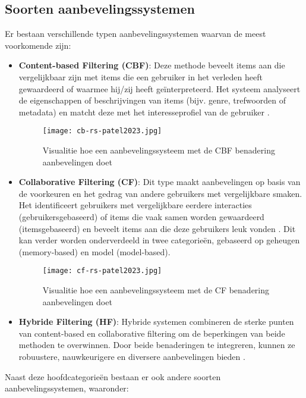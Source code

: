 \subsection{Soorten aanbevelingssystemen}
Er bestaan verschillende typen aanbevelingssystemen waarvan de meest voorkomende zijn:
\begin{itemize}
  \item \textbf{Content-based Filtering (CBF)}: Deze methode beveelt items aan die vergelijkbaar zijn met items die een gebruiker in het verleden heeft gewaardeerd of waarmee hij/zij heeft geïnterpreteerd. Het systeem analyseert de eigenschappen of beschrijvingen van items (bijv. genre, trefwoorden of metadata) en matcht deze met het interesseprofiel van de gebruiker \autocite{Patel2023}.
  \begin{figure}
    \centering
    \texttt{[image: cb-rs-patel2023.jpg]}
    \caption[Content-based Filtering aanbevelingssysteem]{\label{fig:CBFRS} Visualitie hoe een aanbevelingssysteem met de CBF benadering aanbevelingen doet \autocite{Patel2023}}
  \end{figure}
  \item \textbf{Collaborative Filtering (CF)}: Dit type maakt aanbevelingen op basis van de voorkeuren en het gedrag van andere gebruikers met vergelijkbare smaken. Het identificeert gebruikers met vergelijkbare eerdere interacties (gebruikersgebaseerd) of items die vaak samen worden gewaardeerd (itemsgebaseerd) en beveelt items aan die deze gebruikers leuk vonden \autocite{Patel2023}. Dit kan verder worden onderverdeeld in twee categorieën, gebaseerd op geheugen (memory-based) en model (model-based).
  \begin{figure}
    \centering
    \texttt{[image: cf-rs-patel2023.jpg]}
    \caption[Collaborative Filtering aanbevelingssysteem]{\label{fig:CFRS} Visualitie hoe een aanbevelingssysteem met de CF benadering aanbevelingen doet \autocite{Patel2023}}
  \end{figure}
  \item \textbf{Hybride Filtering (HF)}: Hybride systemen combineren de sterke punten van content-based en collaborative filtering om de beperkingen van beide methoden te overwinnen. Door beide benaderingen te integreren, kunnen ze robuustere, nauwkeurigere en diversere aanbevelingen bieden \autocite{Patel2023}.
\end{itemize}
Naast deze hoofdcategorieën bestaan er ook andere soorten aanbevelingssystemen, waaronder:
